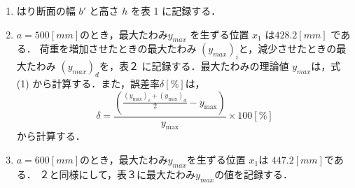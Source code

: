 \documentclass[a4paper,11pt]{jsarticle}
\begin{document}
\begin{enumerate}
  \item はり断面の幅 $b'$ と高さ $h$ を表 1 に記録する．
  \item $a = 500 [mm] $のとき，最大たわみ$y_{max}$ を生ずる位置 $x_1$ は$ 428.2 [mm]$ である．
  荷重を増加させたときの最大たわみ $(y_{max})_i$と，減少させたときの最大たわみ $(y_{max})_d$を，表２
  に記録する．最大たわみの理論値 $y_{max}$は，式 (1) から計算する．また，誤差率$ \delta [\%]$は，
  \begin{equation} 
    \delta = \frac{{\left(\frac{{(y_{\text{max}})_i + (y_{\text{max}})_d}}{2} - y_{\text{max}}\right)}}{{y_{\text{max}}}} \times 100[\%]
  \end{equation}
  から計算する．
  \item $a = 600 [mm] $のとき，最大たわみ$ y_{max}$を生ずる位置 $x_1$は $447.2 [mm] $である．
  ２と同様にして，表３に最大たわみ$y_{max}$の値を記録する．
  
\end{enumerate}
\end{document}
